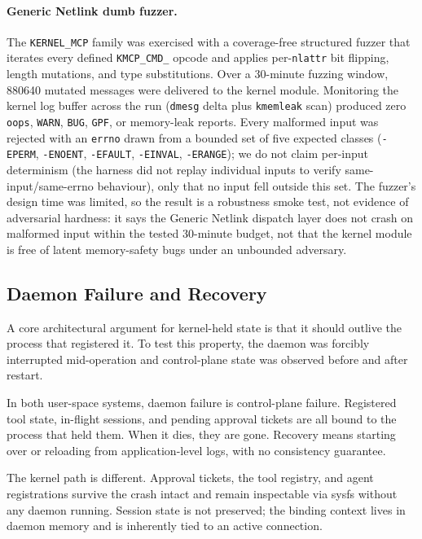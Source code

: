 \paragraph{Generic Netlink dumb fuzzer.}
The \texttt{KERNEL\_\allowbreak MCP} family was exercised with a coverage-free structured fuzzer that iterates every defined \texttt{KMCP\_\allowbreak CMD\_\allowbreak *} opcode and applies per-\texttt{nlattr} bit flipping, length mutations, and type substitutions.
Over a \num{30}-minute fuzzing window, \num{880640} mutated messages were delivered to the kernel module.
Monitoring the kernel log buffer across the run (\texttt{dmesg} delta plus \texttt{kmemleak} scan) produced zero \texttt{oops}, \texttt{WARN}, \texttt{BUG}, \texttt{GPF}, or memory-leak reports.
Every malformed input was rejected with an \texttt{errno} drawn from a bounded set of five expected classes (\texttt{-EPERM}, \texttt{-ENOENT}, \texttt{-EFAULT}, \texttt{-EINVAL}, \texttt{-ERANGE}); we do not claim per-input determinism (the harness did not replay individual inputs to verify same-input/same-errno behaviour), only that no input fell outside this set.
The fuzzer's design time was limited, so the result is a robustness smoke test, not evidence of adversarial hardness: it says the Generic Netlink dispatch layer does not crash on malformed input within the tested \num{30}-minute budget, not that the kernel module is free of latent memory-safety bugs under an unbounded adversary.


\subsection{Daemon Failure and Recovery}
\label{sec:daemon-failure}

A core architectural argument for kernel-held state is that it should outlive the process that registered it.
To test this property, the daemon was forcibly interrupted mid-operation and control-plane state was observed before and after restart.

In both user-space systems, daemon failure is control-plane failure.
Registered tool state, in-flight sessions, and pending approval tickets are all bound to the process that held them.
When it dies, they are gone.
Recovery means starting over or reloading from application-level logs, with no consistency guarantee.

The kernel path is different.
Approval tickets, the tool registry, and agent registrations survive the crash intact and remain inspectable via sysfs without any daemon running.
Session state is not preserved; the binding context lives in daemon memory and is inherently tied to an active connection.

